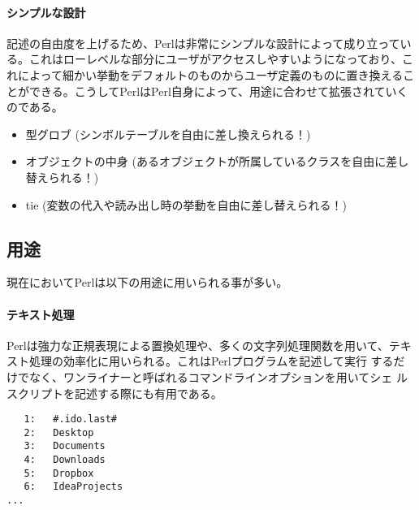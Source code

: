 \documentclass[a4paper,9pt]{jarticle}
\begin{document}
\paragraph{シンプルな設計}
記述の自由度を上げるため、Perlは非常にシンプルな設計によって成り立っている。これはローレベルな部分にユーザがアクセスしやすいようになっており、これによって細かい挙動をデフォルトのものからユーザ定義のものに置き換えることができる。こうしてPerlはPerl自身によって、用途に合わせて拡張されていくのである。
\begin{itemize}
  \item 型グロブ (シンボルテーブルを自由に差し換えられる！)
  \item オブジェクトの中身 (あるオブジェクトが所属しているクラスを自由に差し替えられる！)
  \item tie (変数の代入や読み出し時の挙動を自由に差し替えられる！)
\end{itemize}

\subsection{用途}
現在においてPerlは以下の用途に用いられる事が多い。
\paragraph*{テキスト処理}
Perlは強力な正規表現による置換処理や、多くの文字列処理関数を用いて、テキ
スト処理の効率化に用いられる。これはPerlプログラムを記述して実行
するだけでなく、ワンライナーと呼ばれるコマンドラインオプションを用いてシェ
ルスクリプトを記述する際にも有用である。

\begin{lstlisting}[caption=標準入力のソースに行番号を付けて標準出力へ]
% ls | perl -ple 'printf "%4d:\t", $.'
   1:	#.ido.last#
   2:	Desktop
   3:	Documents
   4:	Downloads
   5:	Dropbox
   6:	IdeaProjects
...
\end{lstlisting}　
\end{document}
